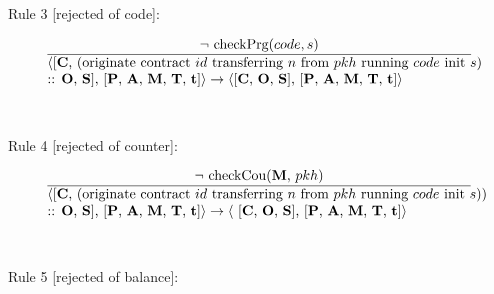 \documentclass[a4paper]{llncs}
\begin{document}
\begin{mathpar}
\end{mathpar}
~\\
~\\
Rule 3 [rejected of code]:

\begin{equation}{}
\frac{\text{$\neg$ checkPrg($code, s$)}}{\parbox{4.2in}{\text{$\langle$[\ACCOUNTS, (originate contract ${id}$ transferring  ${n}$ from ${pkh}$ running ${code}$ init ${s}$)} \text{:: \OPERATIONS, \CONTRACTS], [\PENDING, \ACCEPTED, \MANAGERS, \CONTRACTORS, \TIME]$\rangle \rightarrow \langle$[\ACCOUNTS, \OPERATIONS, \CONTRACTS],} \text{[\PENDING, \ACCEPTED, \MANAGERS, \CONTRACTORS, \TIME]$\rangle$}}} 
\end{equation}
~\\
~\\
Rule 4 [rejected of counter]:

\begin{equation}{}
\frac{\text{$\neg$ checkCou(\MANAGERS, $pkh$)}}{\parbox{4.2in}{\text{$\langle$[\ACCOUNTS, (originate contract ${id}$ transferring  ${n}$ from ${pkh}$ running ${code}$ init ${s}$))} \text{:: \OPERATIONS, \CONTRACTS], [\PENDING, \ACCEPTED, \MANAGERS, \CONTRACTORS, \TIME]$\rangle \rightarrow \langle$ [\ACCOUNTS, \OPERATIONS, \CONTRACTS],} \text{[\PENDING, \ACCEPTED, \MANAGERS, \CONTRACTORS, \TIME]$\rangle$}}} 
\end{equation}
~\\
~\\
Rule 5 [rejected of balance]:
\end{document}
